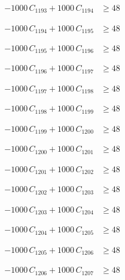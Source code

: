 \documentclass[a4paper,11pt]{article}
\begin{document}
\begin{align}
-1000\,C_{1193} + 1000\,C_{1194} &\geq 48 \nonumber
\end{align}

\begin{align}
-1000\,C_{1194} + 1000\,C_{1195} &\geq 48 \nonumber
\end{align}

\begin{align}
-1000\,C_{1195} + 1000\,C_{1196} &\geq 48 \nonumber
\end{align}

\begin{align}
-1000\,C_{1196} + 1000\,C_{1197} &\geq 48 \nonumber
\end{align}

\begin{align}
-1000\,C_{1197} + 1000\,C_{1198} &\geq 48 \nonumber
\end{align}

\begin{align}
-1000\,C_{1198} + 1000\,C_{1199} &\geq 48 \nonumber
\end{align}

\begin{align}
-1000\,C_{1199} + 1000\,C_{1200} &\geq 48 \nonumber
\end{align}

\begin{align}
-1000\,C_{1200} + 1000\,C_{1201} &\geq 48 \nonumber
\end{align}

\begin{align}
-1000\,C_{1201} + 1000\,C_{1202} &\geq 48 \nonumber
\end{align}

\begin{align}
-1000\,C_{1202} + 1000\,C_{1203} &\geq 48 \nonumber
\end{align}

\begin{align}
-1000\,C_{1203} + 1000\,C_{1204} &\geq 48 \nonumber
\end{align}

\begin{align}
-1000\,C_{1204} + 1000\,C_{1205} &\geq 48 \nonumber
\end{align}

\begin{align}
-1000\,C_{1205} + 1000\,C_{1206} &\geq 48 \nonumber
\end{align}

\begin{align}
-1000\,C_{1206} + 1000\,C_{1207} &\geq 48 \nonumber
\end{align}
\end{document}
